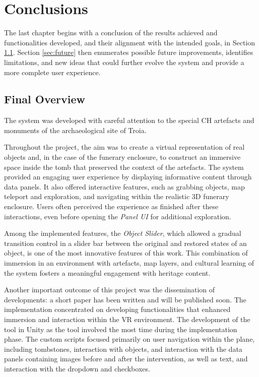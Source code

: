 
%

\chapter{Conclusions}
\label{cha:conclusions}
The last chapter begins with a conclusion of the results achieved and functionalities developed, and their alignment with the intended goals, in Section \ref{sec:final_overview}.
Section \ref{sec:future} then enumerates possible future improvements, identifies limitations, and new ideas that could further evolve the system and provide a more complete user experience.
\section{Final Overview}
\label{sec:final_overview}
The system was developed with careful attention to the special \gls{CH} artefacts and monuments of the archaeological site of Troia. 

Throughout the project, the aim was to create a virtual representation of real objects and, in the case of the funerary enclosure, to construct an immersive space inside the tomb that preserved the context of the artefacts.
The system provided an engaging user experience by displaying informative content through data panels. It also offered interactive features, such as grabbing objects, map teleport and exploration, and navigating within the realistic \gls{3D} funerary enclosure. Users often perceived the experience as finished after these interactions, even before opening the \emph{Panel \gls{UI}} for additional exploration. 

Among the implemented features, the \emph{Object Slider}, which allowed a gradual transition control in a slider bar between the original and restored states of an object, is one of the most innovative features of this work. This combination of immersion in an environment with artefacts, map layers, and cultural learning of the system fosters a meaningful engagement with heritage content.

Another important outcome of this project was the dissemination of developments: a short paper has been written and will be published soon.
The implementation concentrated on developing functionalities that enhanced immersion and interaction within the \gls{VR} environment. 
The development of the tool in Unity as the tool involved the most time during the implementation phase. The custom scripts focused primarily on user navigation within the plane, including tombstones, interaction with objects, and interaction with the data panels containing images before and after the intervention, as well as text, and interaction with the dropdown and checkboxes. 

